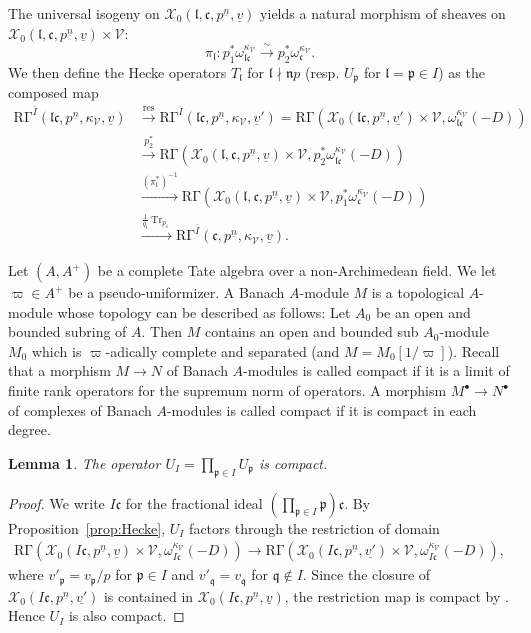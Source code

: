 \documentclass[11pt]{amsart}
\theoremstyle{definition} %
\theoremstyle{plain} %
\newtheorem{lemma}[definition]{Lemma}
\theoremstyle{remark} %
\newcommand{\cV}{{\mathcal V}}
\newcommand{\cX}{{\mathcal X}}
\newcommand{\frakc}{\mathfrak c}
\newcommand{\frakl}{\mathfrak l}
\newcommand{\frakn}{\mathfrak n}
\newcommand{\frakp}{\mathfrak p}
\newcommand{\frakq}{\mathfrak q}
\DeclareMathOperator\Tr{Tr} %
\newcommand{\RG}{\mathrm{R\Gamma}}
\begin{document}
The universal isogeny on $\cX_0(\frakl,\frakc,p^{\underline{n}},\underline{v})$ yields a natural morphism of  sheaves on $\cX_0(\frakl,\frakc,p^{\underline{n}},\underline{v})\times \cV$:
\[ \pi_\frakl\colon p_1^\ast \omega^{\kappa_\cV}_{\frakl\frakc}\xrightarrow\sim p_2^\ast \omega^{\kappa_\cV}_{\frakc}. \]
We then define the Hecke operators $T_\frakl$ for $\frakl \nmid \frakn p$ (resp. $U_\frakp$ for $\frakl=\frakp\in I$) as the composed map
\begin{align*}
\RG^{\overline{I}}(\frakl\frakc, p^{\underline{n}}, \kappa_\cV,\underline{v})&\xrightarrow{\mathrm{res}} 
\RG^{\overline{I}}(\frakl\frakc, p^{\underline{n}}, \kappa_\cV,\underline{v}')
=\RG(\cX_0(\frakl\frakc,p^{\underline{n}},\underline{v'})\times \cV, \omega^{\kappa_\cV}_{\frakl\frakc}(-D))\\
&\xrightarrow{p_2^\ast}  
\RG(\cX_0(\frakl,\frakc,p^{\underline{n}},\underline{v})\times \cV, p_2^\ast\omega^{\kappa_\cV}_{\frakl\frakc}(-D)) \\
&\xrightarrow{(\pi_\frakl^{\ast})^{-1}}
\RG(\cX_0(\frakl,\frakc,p^{\underline{n}},\underline{v})\times \cV, p_1^\ast\omega^{\kappa_\cV}_\frakc(-D)) \\
&\xrightarrow{{\frac1{q_\frakl}}\Tr_{p_1}} \RG^{\overline{I}}(\frakc, p^{\underline{n}}, \kappa_\cV,\underline{v}).
\end{align*}

Let $(A,A^+)$ be a complete Tate algebra over a non-Archimedean field.
We let $\varpi\in A^+$ be a pseudo-uniformizer.
A Banach $A$-module $M$ is a topological $A$-module whose topology can be described as follows: Let $A_0$ be an open and bounded subring of $A$.
Then $M$ contains an open and bounded sub $A_0$-module $M_0$ which is $\varpi$-adically complete and separated (and $M = M_0[1/\varpi]$).
Recall that a morphism $M\rightarrow N$ of Banach $A$-modules is called compact if it is a limit of finite rank operators for the supremum norm of operators.
A morphism $M^\bullet \rightarrow N^\bullet$ of complexes of Banach $A$-modules is called compact if it is compact in each degree.

\begin{lemma} \label{lem:Upcompact}
The operator $U_I=\prod_{\frakp\in I}U_\frakp$ is compact.
\end{lemma}
\begin{proof}
We write $I\frakc$ for the fractional ideal $(\prod_{\frakp\in I} \frakp) \frakc$.
By Proposition~\ref{prop:Hecke}, $U_I$ factors through the restriction of domain
\begin{align*}
\RG(\cX_0(I\frakc,p^{\underline{n}},\underline{v})\times \cV, \omega^{\kappa_\cV}_{I\frakc}(-D))
\rightarrow 
\RG(\cX_0(I\frakc,p^{\underline{n}},\underline{v'})\times \cV, \omega^{\kappa_\cV}_{I\frakc}(-D)),
\end{align*}
where $v'_\frakp = v_\frakp/p$ for $\frakp\in I$ and $v'_\frakq = v_\frakq$ for $\frakq\notin I$. Since the closure of $\cX_0(I\frakc,p^{\underline{n}},\underline{v'})$ is contained in $\cX_0(I\frakc,p^{\underline{n}},\underline{v})$, the restriction map is compact by \cite[Lemma~2.5.23]{BP}.
Hence $U_I$ is also compact.
\end{proof}
\end{document}
